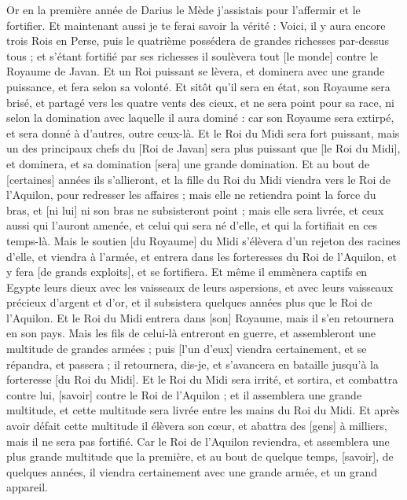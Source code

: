 \begin{multicols}{2}
\VerseOne{}Or en la première année de Darius le Mède j'assistais pour l'affermir et le fortifier.
Et maintenant aussi je te ferai savoir la vérité : Voici, il y aura encore trois Rois en Perse, puis le quatrième possédera de grandes richesses par-dessus tous ; et s'étant fortifié par ses richesses il soulèvera tout [le monde] contre le Royaume de Javan.
Et un Roi puissant se lèvera, et dominera avec une grande puissance, et fera selon sa volonté.
Et sitôt qu'il sera en état, son Royaume sera brisé, et partagé vers les quatre vents des cieux, et ne sera point pour sa race, ni selon la domination avec laquelle il aura dominé : car son Royaume sera extirpé, et sera donné à d'autres, outre ceux-là.
Et le Roi du Midi sera fort puissant, mais un des principaux chefs du [Roi de Javan] sera plus puissant que [le Roi du Midi], et dominera, et sa domination [sera] une grande domination.
Et au bout de [certaines] années ils s'allieront, et la fille du Roi du Midi viendra vers le Roi de l'Aquilon, pour redresser les affaires ; mais elle ne retiendra point la force du bras, et [ni lui] ni son bras ne subsisteront point ; mais elle sera livrée, et ceux aussi qui l'auront amenée, et celui qui sera né d'elle, et qui la fortifiait en ces temps-là.
Mais le soutien [du Royaume] du Midi s'élèvera d'un rejeton des racines d'elle, et viendra à l'armée, et entrera dans les forteresses du Roi de l'Aquilon, et y fera [de grands exploits], et se fortifiera.
Et même il emmènera captifs en Egypte leurs dieux avec les vaisseaux de leurs aspersions, et avec leurs vaisseaux précieux d'argent et d'or, et il subsistera quelques années plus que le Roi de l'Aquilon.
Et le Roi du Midi entrera dans [son] Royaume, mais il s'en retournera en son pays.
Mais les fils de celui-là entreront en guerre, et assembleront une multitude de grandes armées ; puis [l'un d'eux] viendra certainement, et se répandra, et passera ; il retournera, dis-je, et s'avancera en bataille jusqu'à la forteresse [du Roi du Midi].
Et le Roi du Midi sera irrité, et sortira, et combattra contre lui, [savoir] contre le Roi de l'Aquilon ; et il assemblera une grande multitude, et cette multitude sera livrée entre les mains du Roi du Midi.
Et après avoir défait cette multitude il élèvera son cœur, et abattra des [gens] à milliers, mais il ne sera pas fortifié.
Car le Roi de l'Aquilon reviendra, et assemblera une plus grande multitude que la première, et au bout de quelque temps, [savoir], de quelques années, il viendra certainement avec une grande armée, et un grand appareil.

\end{multicols}
